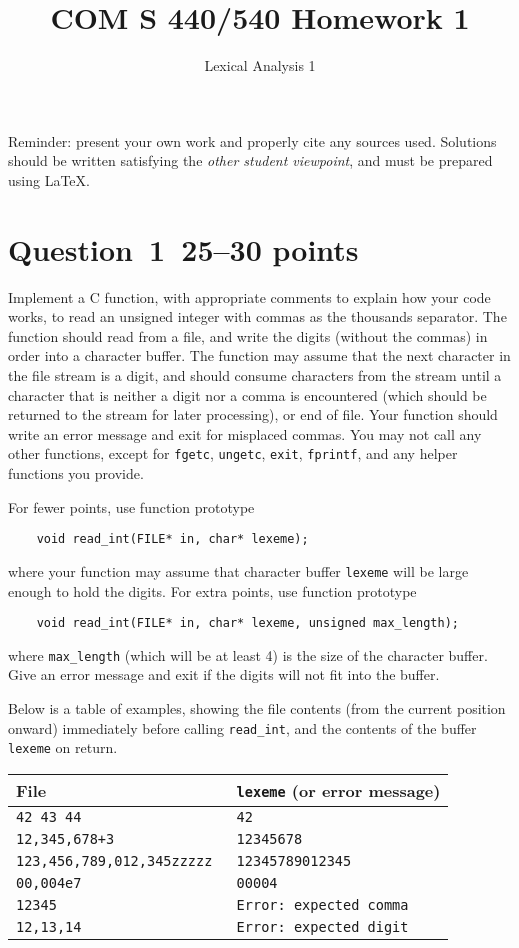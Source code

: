 \documentclass[10pt]{article}
\title{COM S 440/540 Homework 1}
\date{}
\author{Lexical Analysis 1}
\renewcommand{\thepage}{~}
\begin{document}
\maketitle

\noindent
Reminder: present your own work and properly cite any sources used.
Solutions should be written satisfying the \emph{other student viewpoint},
and must be prepared using \LaTeX.
\renewcommand{\thepage}{~}
 
\section*{Question~1~\hfill 25--30 points}

Implement a C function,
with appropriate comments to explain how your code works,
to read an unsigned integer with commas as the thousands separator.
The function should read from a file,
and write the digits (without the commas) in order into a character buffer.
The function may assume that the next character in the file stream
is a digit,
and should consume characters from the stream until a
character that is neither a digit nor a comma is encountered
(which should be returned to the stream for later processing), or end of file.
Your function should write an error message and exit for misplaced commas.
You may not call any other functions, except for
{\tt fgetc}, {\tt ungetc}, {\tt exit}, {\tt fprintf},
and any helper functions you provide.

For fewer points, use function prototype
\begin{verbatim}
    void read_int(FILE* in, char* lexeme);
\end{verbatim}
where your function may assume that character buffer {\tt lexeme} will
be large enough to hold the digits.
For extra points, use function prototype
\begin{verbatim}
    void read_int(FILE* in, char* lexeme, unsigned max_length);
\end{verbatim}
where {\tt max\_length} (which will be at least 4)
is the size of the character buffer.
Give an error message and exit if the digits will not fit into the buffer.

Below is a table of examples,
showing the file contents (from the current position onward)
immediately before calling \verb|read_int|,
and the contents of the buffer {\tt lexeme} on return.
\begin{center}
\begin{tabular}{l|l}
  File & {\tt lexeme} (or error message)
\\ \hline
  \tt 42 43 44& \tt 42
\\
  \tt 12,345,678+3 & \tt 12345678
\\
  \tt 123,456,789,012,345zzzzz & \tt 12345789012345
\\
  \tt 00,004e7 & \tt 00004
\\[2mm]
  \tt 12345 & \tt Error: expected comma
\\
  \tt 12,13,14 & \tt Error: expected digit
\\
\end{tabular}
\end{center}
\end{document}
